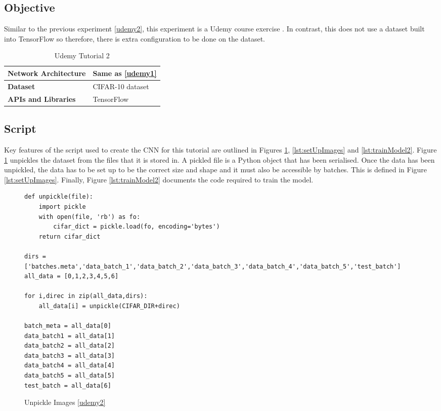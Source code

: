 \tocless\subsection{Objective}
Similar to the previous experiment \ref{udemy2}, this experiment is a Udemy course exercise \parencite{udemy}. In contrast, this does not use a dataset built into TensorFlow so therefore, there is extra configuration to be done on the dataset.

\begin{table}[h]
\centering
\caption{Udemy Tutorial 2}
\label{my-label}
\begin{tabular}{|l|p{8cm}|}
\hline
\textbf{Network Architecture} & Same as \ref{udemy1}            \\ \hline
\textbf{Dataset}              & CIFAR-10 dataset \\ \hline
\textbf{APIs and Libraries}   & TensorFlow                                                         \\ \hline
\end{tabular}
\end{table}

\tocless\subsection{Script}
Key features of the script used to create the CNN for this tutorial are outlined in Figures \ref{lst:unpickle}, \ref{lst:setUpImages} and \ref{lst:trainModel2}.
Figure \ref{lst:unpickle} unpickles the dataset from the files that it is stored in.
A pickled file is a Python object that has been serialised.
Once the data has been unpickled, the data has to be set up to be the correct size and shape and it must also be accessible by batches.
This is defined in Figure \ref{lst:setUpImages}.
Finally, Figure \ref{lst:trainModel2} documents the code required to train the model.

\begin{figure}[h]
\caption{Unpickle Images \ref{udemy2}}
\label{lst:unpickle}
\begin{lstlisting}[style=Python]
def unpickle(file):
    import pickle
    with open(file, 'rb') as fo:
        cifar_dict = pickle.load(fo, encoding='bytes')
    return cifar_dict

dirs = ['batches.meta','data_batch_1','data_batch_2','data_batch_3','data_batch_4','data_batch_5','test_batch']
all_data = [0,1,2,3,4,5,6]

for i,direc in zip(all_data,dirs):
    all_data[i] = unpickle(CIFAR_DIR+direc)

batch_meta = all_data[0]
data_batch1 = all_data[1]
data_batch2 = all_data[2]
data_batch3 = all_data[3]
data_batch4 = all_data[4]
data_batch5 = all_data[5]
test_batch = all_data[6]
\end{lstlisting}
\end{figure}

